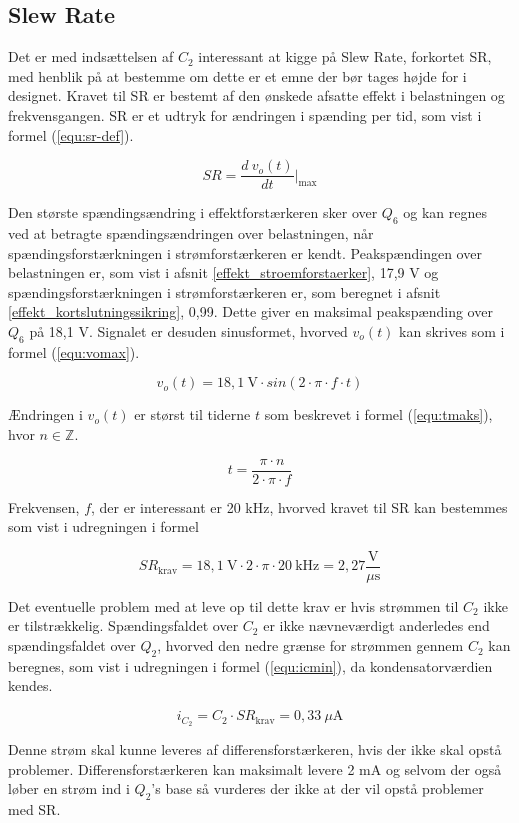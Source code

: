 \subsection{Slew Rate}
\label{effekt_slewrate}
Det er med indsættelsen af $C_2$ interessant at kigge på Slew Rate, forkortet SR, med henblik på at bestemme om dette er et emne der bør tages højde for i designet. Kravet til SR er bestemt af den ønskede afsatte effekt i belastningen og frekvensgangen. SR er et udtryk for ændringen i spænding per tid, som vist i formel (\ref{equ:sr-def}). 

\begin{equation}
\label{equ:sr-def}
SR = \frac{d~v_o(t)}{dt} \Biggr\vert _\mathrm{max}
\end{equation}

Den største spændingsændring i effektforstærkeren sker over $Q_6$ og kan regnes ved at betragte spændingsændringen over belastningen, når spændingsforstærkningen i strømforstærkeren er kendt. Peakspændingen over belastningen er, som vist i afsnit \ref{effekt_stroemforstaerker}, 17,9 V og spændingsforstærkningen i strømforstærkeren er, som beregnet i afsnit \ref{effekt_kortslutningssikring}, 0,99. Dette giver en maksimal peakspænding over $Q_6$ på 18,1 V. Signalet er desuden sinusformet, hvorved $v_o(t)$ kan skrives som i formel (\ref{equ:vomax}).

\begin{equation}
\label{equ:vomax}
v_o(t) = 18,1~\mathrm{V} \cdot sin\left( 2 \cdot \pi \cdot f \cdot t \right) 
\end{equation}

Ændringen i $v_o(t)$ er størst til tiderne $t$ som beskrevet i formel (\ref{equ:tmaks}), hvor $n \in \mathbb{Z}$.

\begin{equation}
\label{equ:tmaks}
t = \frac{\pi \cdot n}{2 \cdot \pi \cdot f}
\end{equation}

Frekvensen, $f$, der er interessant er 20 kHz, hvorved kravet til SR kan bestemmes som vist i udregningen i formel 

\begin{equation}
\label{equ:}
SR_\mathrm{krav} = 18,1~\mathrm{V} \cdot 2 \cdot \pi \cdot 20~\mathrm{kHz} =  2,27\frac{\mathrm{V}}{\mu\mathrm{s}}
\end{equation}

Det eventuelle problem med at leve op til dette krav er hvis strømmen til $C_2$ ikke er tilstrækkelig. Spændingsfaldet over $C_2$ er ikke nævneværdigt anderledes end spændingsfaldet over $Q_2$, hvorved den nedre grænse for strømmen gennem $C_2$ kan beregnes, som vist i udregningen i formel (\ref{equ:icmin}), da kondensatorværdien kendes.

\begin{equation}
\label{equ:icmin}
i_{C_2} = C_2 \cdot SR_\mathrm{krav} = 0,33~\mu \mathrm{A}
\end{equation}

Denne strøm skal kunne leveres af differensforstærkeren, hvis der ikke skal opstå problemer. Differensforstærkeren kan maksimalt levere 2 mA og selvom der også løber en strøm ind i $Q_2$'s base så vurderes der ikke at der vil opstå problemer med SR.